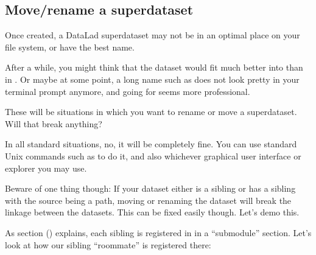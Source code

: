 \ignorespaces 

\subsection{Move/rename a superdataset}
\label{\detokenize{basics/101-136-filesystem:move-rename-a-superdataset}}\label{\detokenize{basics/101-136-filesystem:index-11}}
\sphinxAtStartPar
Once created, a DataLad superdataset may not be in an optimal
place on your file system, or have the best name.

\sphinxAtStartPar
After a while, you might think that the dataset would fit much
better into  than in
. Or maybe at
some point, a long name such as 
does not look pretty in your terminal prompt anymore, and going for
 seems more professional.

\sphinxAtStartPar
These will be situations in which you want to rename or move
a superdataset. Will that break anything?

\sphinxAtStartPar
In all standard situations, no, it will be completely fine.
You can use standard Unix commands such as  to do it,
and also whichever graphical user interface or explorer you may
use.

\sphinxAtStartPar
Beware of one thing though: If your dataset either is a sibling
or has a sibling with the source being a path, moving or renaming
the dataset will break the linkage between the datasets. This can
be fixed easily though. Let’s demo this.

\ignorespaces 
\sphinxAtStartPar
As section {\hyperref[\detokenize{basics/101-122-config:config}]{}} () explains, each
sibling is registered in  in a “submodule” section.
Let’s look at how our sibling “roommate” is registered there:

